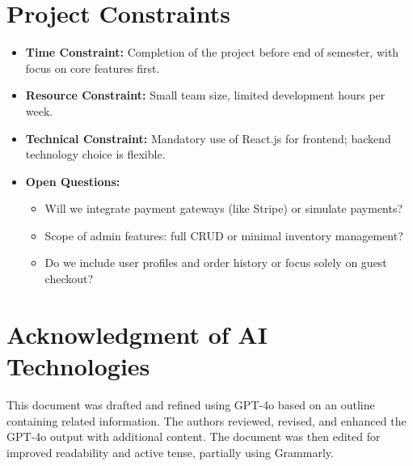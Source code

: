 \documentclass[a4paper,12pt]{article}
\begin{document}
	\section{Project Constraints}
	\begin{itemize}
		\item \textbf{Time Constraint:} Completion of the project before end of semester, with focus on core features first.
		\item \textbf{Resource Constraint:} Small team size, limited development hours per week.
		\item \textbf{Technical Constraint:} Mandatory use of React.js for frontend; backend technology choice is flexible.
		\item \textbf{Open Questions:}
		\begin{itemize}
			\item Will we integrate payment gateways (like Stripe) or simulate payments?
			\item Scope of admin features: full CRUD or minimal inventory management?
			\item Do we include user profiles and order history or focus solely on guest checkout?
		\end{itemize}
	\end{itemize}
	
	\section{Acknowledgment of AI Technologies}
	This document was drafted and refined using GPT-4o based on an outline containing related information. The authors reviewed, revised, and enhanced the GPT-4o output with additional content. The document was then edited for improved readability and active tense, partially using Grammarly.
	
\end{document}
